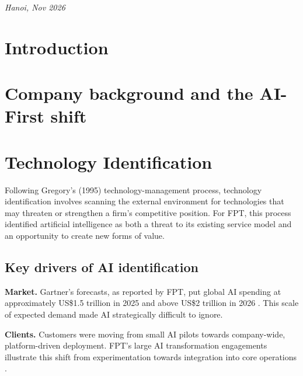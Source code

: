 \documentclass[a4paper,12pt]{report}
\begin{document}
\vfill
\begin{center}
    \textit{Hanoi, Nov 2026}
\end{center}
\newpage


\tableofcontents
\listoffigures
\providecommand{\pending}[1]{\textbf{[#1]}}

\chapter{Introduction}

\chapter{Company background and the AI-First shift}

\chapter{Technology Identification}

Following Gregory's (1995) technology-management process, technology identification involves scanning the external environment for technologies that may threaten or strengthen a firm's competitive position. For FPT, this process identified artificial intelligence as both a threat to its existing service model and an opportunity to create new forms of value.

\section{Key drivers of AI identification}

\textbf{Market.} Gartner's forecasts, as reported by FPT, put global AI spending at approximately US\$1.5 trillion in 2025 and above US\$2 trillion in 2026 \cite{M3}. This scale of expected demand made AI strategically difficult to ignore.

\textbf{Clients.} Customers were moving from small AI pilots towards company-wide, platform-driven deployment. FPT's large AI transformation engagements illustrate this shift from experimentation towards integration into core operations \cite{A22}.
\end{document}
